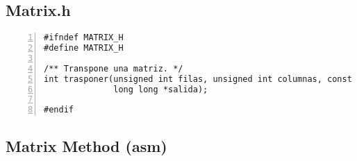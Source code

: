 \documentclass[11pt,a4paper]{article}
\begin{document}
\subsection{Matrix.h}

\begin{lstlisting}[numbers=left, tabsize=2, basicstyle=\fontsize{11}{13}\ttfamily, frame=single, caption={Matrix method (c)}]
#ifndef MATRIX_H
#define MATRIX_H

/** Transpone una matriz. */
int trasponer(unsigned int filas, unsigned int columnas, const long long *entrada,
              long long *salida);

#endif
\end{lstlisting}


\subsection{Matrix Method (asm)}
\end{document}

